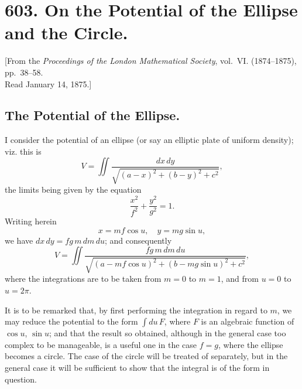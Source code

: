 \documentclass[11pt,a4paper]{book}
\begin{document}
\vspace{2em}


\newpage


\newpage
\section[On the Potential of the Ellipse and the Circle]%
{603. On the Potential of the Ellipse and the Circle.}

\begin{center}
{\small [From the \textit{Proceedings of the London Mathematical Society}, vol.~VI. (1874--1875), pp.~38--58.\\
Read January 14, 1875.]}
\end{center}

\subsection*{The Potential of the Ellipse.}

\begin{art}
I consider the potential of an ellipse (or say an elliptic plate of uniform density); viz. this is
\[
V = \iint \frac{dx\,dy}{\sqrt{(a-x)^2 + (b-y)^2 + c^2}},
\]
the limits being given by the equation
\[
\frac{x^2}{f^2} + \frac{y^2}{g^2} = 1.
\]
Writing herein
\[ x = mf\cos u, \quad y = mg\sin u, \]
we have $dx\,dy = fg\,m\,dm\,du$; and consequently
\[
V = \iint \frac{fg\,m\,dm\,du}{\sqrt{(a - mf\cos u)^2 + (b - mg\sin u)^2 + c^2}},
\]
where the integrations are to be taken from $m=0$ to $m=1$, and from $u=0$ to $u=2\pi$.
\end{art}

\begin{art}
It is to be remarked that, by first performing the integration in regard to $m$, we may reduce the potential to the form $\int du\,F$, where $F$ is an algebraic function of $\cos u$, $\sin u$; and that the result so obtained, although in the general case too complex to be manageable, is a useful one in the case $f=g$, where the ellipse becomes a circle. The case of the circle will be treated of separately, but in the general case it will be sufficient to show that the integral is of the form in question.
\end{art}
\end{document}
